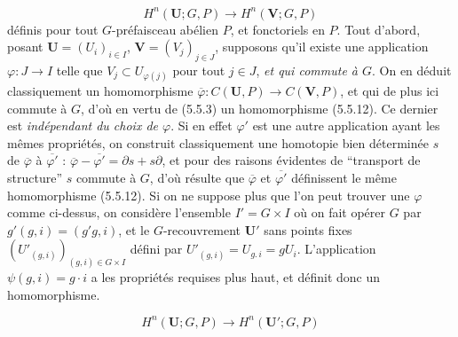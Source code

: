 \[
\tag{5.5.12}
H^n({\mathbf U};G,P)\to H^n({\mathbf V};G,P)
\]
définis pour tout $G$-préfaisceau abélien $P$, et fonctoriels en $P$. Tout
d'abord, posant ${\mathbf U}=(U_i)_{i\in I}$,
${\mathbf V}=(V_j)_{j\in J}$, supposons qu'il existe une application
$\varphi:J\to I$ telle que $V_j\subset U_{\varphi(j)}$ pour tout $j\in J$, \textit{et qui commute à $G$}. On en déduit classiquement un homomorphisme
$\overline\varphi:C({\mathbf U},P)\to C({\mathbf V},P)$, et qui de plus ici
commute à $G$, d'où en vertu de (5.5.3) un homomorphisme (5.5.12). Ce dernier
est \textit{indépendant du choix de $\varphi$}. Si en effet $\varphi'$ est une
autre application ayant les mêmes propriétés, on construit classiquement une
homotopie bien déterminée $s$ de $\overline\varphi$ à
$\overline{\varphi'}$ :
$\overline\varphi-\overline{\varphi'}=\partial s+s\partial$, et pour des raisons
évidentes de ``transport de structure'' $s$ commute à $G$, d'où résulte que
$\overline\varphi$ et $\overline{\varphi'}$ définissent le même homomorphisme
(5.5.12).
Si on ne suppose plus que l'on peut trouver une $\varphi$ comme ci-dessus, on
considère l'ensemble $I'=G\times I$ où on fait opérer $G$ par
$g'(g,i)=(g'g,i)$, et le $G$-recouvrement ${\mathbf U}'$ sans points fixes
$(U'_{(g,i)})_{(g,i)\in G\times I}$ défini par
$U'_{(g,i)}=U_{g.\,i}=gU_i$. L'application
$\psi(g,i)=g\cdot i$ a les propriétés requises plus haut, et définit donc un
homomorphisme.

\[
H^n({\mathbf U};G,P)\to H^n({\mathbf U}';G,P)
\]

